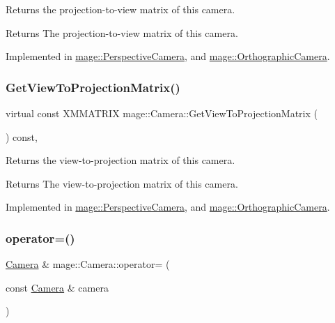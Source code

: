 Returns the projection-\/to-\/view matrix of this camera.

\begin{DoxyReturn}{Returns}
The projection-\/to-\/view matrix of this camera. 
\end{DoxyReturn}


Implemented in \hyperlink{classmage_1_1_perspective_camera_a18a73ab773e3cc50194f700a2f4e288e}{mage\+::\+Perspective\+Camera}, and \hyperlink{classmage_1_1_orthographic_camera_a9917199e789a06624219166f72b940f2}{mage\+::\+Orthographic\+Camera}.

\hypertarget{classmage_1_1_camera_ad3e8380ba9718a983f72d753d08f556e}{}\label{classmage_1_1_camera_ad3e8380ba9718a983f72d753d08f556e} 
\subsubsection{\texorpdfstring{Get\+View\+To\+Projection\+Matrix()}{GetViewToProjectionMatrix()}}
{\footnotesize\ttfamily virtual const X\+M\+M\+A\+T\+R\+IX mage\+::\+Camera\+::\+Get\+View\+To\+Projection\+Matrix (\begin{DoxyParamCaption}{ }\end{DoxyParamCaption}) const\hspace{0.3cm}{\ttfamily [pure virtual]}, {\ttfamily [noexcept]}}

Returns the view-\/to-\/projection matrix of this camera.

\begin{DoxyReturn}{Returns}
The view-\/to-\/projection matrix of this camera. 
\end{DoxyReturn}


Implemented in \hyperlink{classmage_1_1_perspective_camera_a5b733ac978a22dc58b04cf301899d575}{mage\+::\+Perspective\+Camera}, and \hyperlink{classmage_1_1_orthographic_camera_a1e8ea42a5df6dab1163b2c3938480f7c}{mage\+::\+Orthographic\+Camera}.

\hypertarget{classmage_1_1_camera_a9ae561f9cc0ed0dd855ee1d824dad090}{}\label{classmage_1_1_camera_a9ae561f9cc0ed0dd855ee1d824dad090} 
\subsubsection{\texorpdfstring{operator=()}{operator=()}\hspace{0.1cm}{\footnotesize\ttfamily [1/2]}}
{\footnotesize\ttfamily \hyperlink{classmage_1_1_camera}{Camera} \& mage\+::\+Camera\+::operator= (\begin{DoxyParamCaption}\item[{const \hyperlink{classmage_1_1_camera}{Camera} \&}]{camera }\end{DoxyParamCaption})\hspace{0.3cm}{\ttfamily [default]}}

